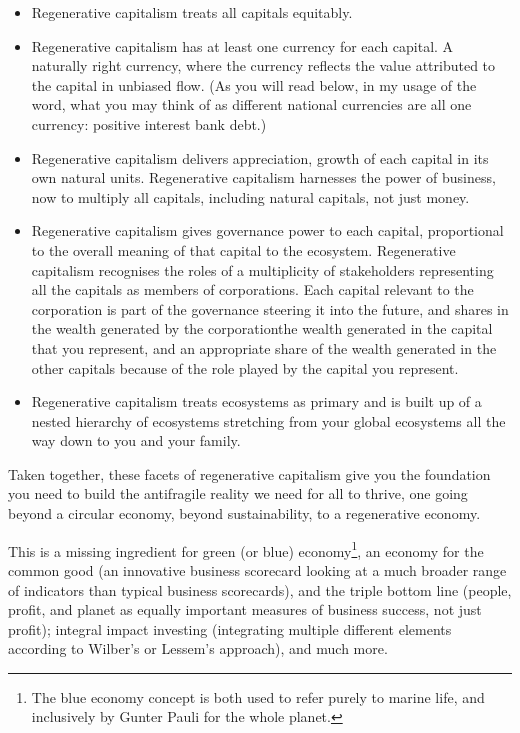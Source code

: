 \begin{itemize}
\item Regenerative capitalism treats all capitals equitably. 


\item Regenerative capitalism has at least one currency  for each capital. A naturally right currency, where the currency reflects the value attributed to the capital in unbiased flow. (As you will read below, in my usage of the word, what you may think of as different national currencies are all one currency: positive interest bank debt.)


\item Regenerative capitalism delivers appreciation, growth of each capital in its own natural units. Regenerative capitalism harnesses the power of business, now to multiply all capitals, including natural capitals, not just money.


\item Regenerative capitalism gives governance power to each capital, proportional to the overall meaning of that capital to the ecosystem. Regenerative capitalism recognises the roles of a multiplicity of stakeholders representing all the capitals as members of corporations. Each capital relevant to the corporation is part of the governance steering it into the future, and shares in the wealth  generated by the corporation\textemdash the wealth generated in the capital that you represent, and an appropriate share of the wealth generated in the other capitals because of the role played by the capital you represent.


\item Regenerative capitalism treats ecosystems as primary and is built up of a nested hierarchy of ecosystems stretching from your global ecosystems all the way down to you and your family.
\end{itemize}




Taken together, these facets of regenerative capitalism  give you the foundation you need to build the antifragile reality we need for all to thrive\cite{russell-thrivability}, one going beyond a circular economy, beyond sustainability, to a regenerative economy. 


This is a missing ingredient for green (or blue) economy\footnote{The blue economy concept is both used to refer purely to marine life\cite{wiki-blue-economy}, and inclusively by Gunter Pauli for the whole planet\cite{pauli-blue-economy}.}, an economy for the common good\cite{ecg-website} (an innovative business scorecard looking at a much broader range of indicators than typical business scorecards), and the triple bottom line (people, profit, and planet as equally important measures of business success, not just profit); integral impact investing\cite{dellner-integral} (integrating multiple different elements according to Wilber’s\cite{wilber-integral} or Lessem’s approach), and much more. 


